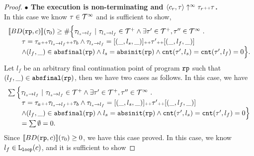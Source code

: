 \begin{proof}
\textbf{$\bullet$ The execution is non-terminating and {$\langle {c_r}, \mathtt{\tau} \rangle \uparrow^{\infty} \mathtt{\tau}_r {\scriptscriptstyle ++} \mathtt{\tau}$}.} 
\\
 In this case we know $\mathtt{\tau} \in \mathcal{T}^{\infty}$ and is sufficient to show,
 \[
  \begin{array}{l}
  \llbracket BD(\mathtt{rp}, c) \rrbracket(\mathtt{\tau}_0) \geq
  \# \Big\{\mathtt{\tau}_{l_s \to l_f} 
  ~\vert~ \mathtt{\tau}_{l_s \to l_f}\in \mathcal{T}^{+} 
  \land \exists  \mathtt{\tau}' \in \mathcal{T}^{+}, \mathtt{\tau}''\in \mathcal{T}^{\infty}
  ~.~ \\ \qquad
   \mathtt{\tau} = \mathtt{\tau}_a {\scriptscriptstyle ++} \mathtt{\tau}_{l_s \to l_f} {\scriptscriptstyle ++} \mathtt{\tau}_b
  \land \mathtt{\tau}_{l_s \to l_f} = [(\_, l_s, \_)] {\scriptscriptstyle ++} \mathtt{\tau}' {\scriptscriptstyle ++} [(\_, l_f, \_)]
\\ \qquad
  \land (l_{f}, \_) \in \mathtt{abs}{\mathtt{final}}(\mathtt{rp})
  \land l_s = \mathtt{abs}{\mathtt{init}}(\mathtt{rp})
  \land \mathtt{cnt}(\mathtt{\tau}', l_s) = \mathtt{cnt}(\mathtt{\tau}', l_f) = 0 
  \Big\}.
  \end{array}
\]
Let $l_f$ be an arbitrary final continuation point of program $\mathtt{rp}$ such that $(l_{f}, \_) \in \mathtt{abs}{\mathtt{final}}(\mathtt{rp})$,
then we have two cases as follows.
In this case, we have 
\[
  \begin{array}{l}
    \sum \Big\{\mathtt{\tau}_{l_s \to l_f} 
    ~\vert~ \mathtt{\tau}_{l_s \to l_f}\in \mathcal{T}^{+} 
    \land \exists  \mathtt{\tau}' \in \mathcal{T}^{+}, \mathtt{\tau}''\in \mathcal{T}^{\infty}
    ~.~ \\ \qquad
    \mathtt{\tau} = \mathtt{\tau}_a {\scriptscriptstyle ++} \mathtt{\tau}_{l_s \to l_f} {\scriptscriptstyle ++} \mathtt{\tau}_b
    \land \mathtt{\tau}_{l_s \to l_f} = [(\_, l_s, \_)] {\scriptscriptstyle ++} \mathtt{\tau}' {\scriptscriptstyle ++} [(\_, l_f, \_)]
    \\ \qquad
  \land (l_{f}, \_) \in \mathtt{abs}{\mathtt{final}}(\mathtt{rp})
  \land l_s = \mathtt{abs}{\mathtt{init}}(\mathtt{rp})
  \land \mathtt{cnt}(\mathtt{\tau}', l_s) = \mathtt{cnt}(\mathtt{\tau}', l_f) = 0 
  \Big\} 
  \\ \qquad = \sum \emptyset = 0.
  \end{array}
\]
Since $ \llbracket BD(\mathtt{rp}, c) \rrbracket(\mathtt{\tau}_0) \geq 0$, we have this case proved.
In this case, we know $l_f \in \mathtt{L}_{\mathtt{loop}}(c)$, and  it is sufficient to show


\end{proof}
